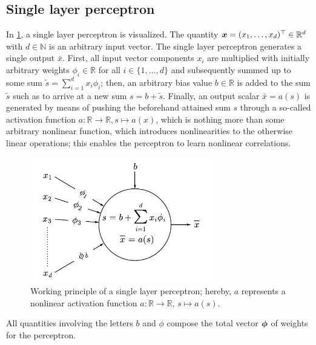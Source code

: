 \documentclass[a4paper,12pt]{report}
\begin{document}
\subsection{Single layer perceptron}
In \cref{fig:SLP}, a single layer perceptron is visualized. The quantity $\bm{x} = (x_1, \dots, x_d)^\top \in\mathbb{R}^d$ with $d \in \mathbb{N}$ is an arbitrary input vector. The single layer perceptron generates a single output $\bar{x}$. First, all input vector components $x_i$ are multiplied with initially arbitrary weights $\phi_i \in \mathbb{R}$ for all $i \in \{1,\dots,d\}$ and subsequently summed up to some sum $\tilde{s} = \sum_{i=1}^{d}x_i\phi_i$; then, an arbitrary bias value $b \in \mathbb{R}$ is added to the sum $\tilde{s}$ such as to arrive at a new sum $s = b + \tilde{s}$. Finally, an output scalar $\bar{x} = a(s)$ is generated by means of pushing the beforehand attained sum $s$ through a so-called activation function $a:\mathbb{R}\rightarrow \mathbb{R}, s\mapsto a(x)$, which is nothing more than some arbitrary nonlinear function, which introduces nonlinearities to the otherwise linear operations; this enables the perceptron to learn nonlinear correlations.
\begin{figure}[h!]
\centering
\includegraphics[width=8cm]{figures/SLP.pdf}
\caption{Working principle of a single layer perceptron; hereby, $a$ represents a nonlinear activation function $a :\mathbb{R}\rightarrow \mathbb{R},\, s\mapsto a(s)$.}
\label{fig:SLP}
\end{figure}
All quantities involving the letters $b$ and $\phi$ compose the total vector $\bm{\phi}$ of weights for the perceptron.
\end{document}
